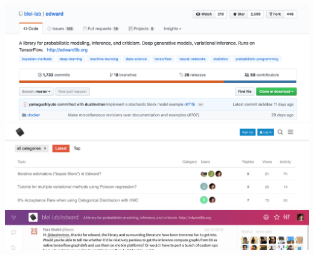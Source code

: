 \documentclass[10pt,
               xcolor={usenames,dvipsnames},
               hyperref={colorlinks,linktoc=all,citecolor=Plum,linkcolor=MidnightBlue,urlcolor=MidnightBlue},noamssymb]{beamer}
\begin{document}


\begin{frame}
\begin{center}
\vspace{-3.5ex}
\includegraphics[width=1.0\textwidth]{img/github.png}
\\[-1ex]
\includegraphics[width=1.0\textwidth]{img/forum.png}
\\[-3ex]
\includegraphics[width=1.0\textwidth]{img/gitter.png}
\\[2ex]
\end{center}
\end{frame}

\end{document}
